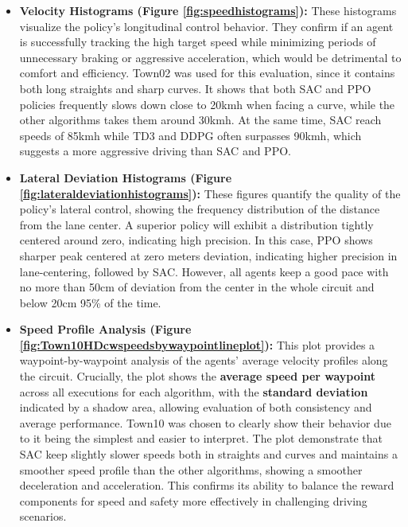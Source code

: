 \documentclass[]{interact}
\begin{document}
\begin{itemize}

    \item \textbf{Velocity Histograms (Figure \ref{fig:speedhistograms}):} These histograms visualize the policy's longitudinal control behavior. They confirm if an agent is successfully tracking the high target speed while minimizing periods of unnecessary braking or aggressive acceleration, which would be detrimental to comfort and efficiency. Town02 was used for this evaluation, since it contains both long straights and sharp curves.
    It shows that both SAC and PPO policies frequently slows down close to 20kmh when facing a curve, while the other algorithms takes them around 30kmh. At the same time, SAC reach speeds of 85kmh while TD3 and DDPG often surpasses 90kmh, which suggests a more aggressive driving than SAC and PPO.

    \item \textbf{Lateral Deviation Histograms (Figure \ref{fig:lateraldeviationhistograms}):} These figures quantify the quality of the policy's lateral control, showing the frequency distribution of the distance from the lane center. A superior policy will exhibit a distribution tightly centered around zero, indicating high precision.
    In this case, PPO shows sharper peak centered at zero meters deviation, indicating higher precision in lane-centering, followed by SAC. However, all agents keep a good pace with no more than 50cm of deviation from the center in the whole circuit and below 20cm 95\% of the time.
    \item \textbf{Speed Profile Analysis (Figure \ref{fig:Town10HDcwspeedsbywaypointlineplot}):} This plot provides a waypoint-by-waypoint analysis of the agents' average velocity profiles along the circuit. Crucially, the plot shows the \textbf{average speed per waypoint} across all executions for each algorithm, with the \textbf{standard deviation} indicated by a shadow area, allowing evaluation of both consistency and average performance. Town10 was chosen to clearly show their behavior due to it being the simplest and easier to interpret.
    The plot demonstrate that SAC keep slightly slower speeds both in straights and curves and maintains a smoother speed profile than the other algorithms, showing a smoother deceleration and acceleration. This confirms its ability to balance the reward components for speed and safety more effectively in challenging driving scenarios.
\end{itemize}
\end{document}
